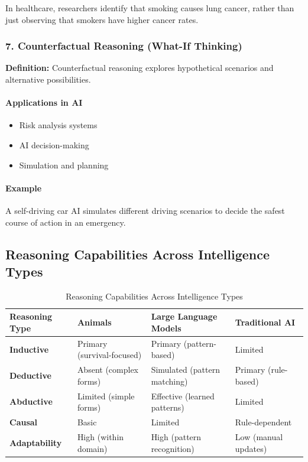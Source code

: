 In healthcare, researchers identify that smoking causes lung cancer, rather than just observing that smokers have higher cancer rates.

\subsubsection{7. Counterfactual Reasoning (What-If Thinking)}

\textbf{Definition:} Counterfactual reasoning explores hypothetical scenarios and alternative possibilities.

\paragraph{Applications in AI}

\begin{itemize}
\item Risk analysis systems
\item AI decision-making
\item Simulation and planning
\end{itemize}

\paragraph{Example}

A self-driving car AI simulates different driving scenarios to decide the safest course of action in an emergency.

\subsection{Reasoning Capabilities Across Intelligence Types}

\begin{table}[h!]
\centering
\begin{tabular}{|l|l|l|l|}
\hline
\textbf{Reasoning Type} & \textbf{Animals} & \textbf{Large Language Models} & \textbf{Traditional AI} \\
\hline
\textbf{Inductive} & Primary (survival-focused) & Primary (pattern-based) & Limited \\
\hline
\textbf{Deductive} & Absent (complex forms) & Simulated (pattern matching) & Primary (rule-based) \\
\hline
\textbf{Abductive} & Limited (simple forms) & Effective (learned patterns) & Limited \\
\hline
\textbf{Causal} & Basic & Limited & Rule-dependent \\
\hline
\textbf{Adaptability} & High (within domain) & High (pattern recognition) & Low (manual updates) \\
\hline
\end{tabular}
\caption{Reasoning Capabilities Across Intelligence Types}
\end{table}

